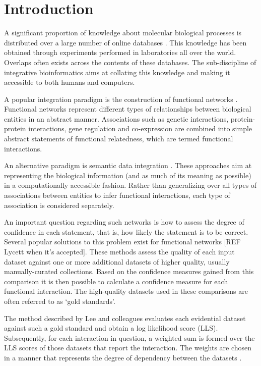 \documentclass{bioinfo}
\newcommand{\note}[1]{{\color{red}[#1]}}
\begin{document}
\section{Introduction} 

A significant proportion of knowledge about molecular biological processes is distributed over a large number of online databases \citep{stein_creating_2002}. This knowledge has been obtained through experiments performed in laboratories all over the world. Overlaps often exists across the contents of these databases. The sub-discipline of integrative bioinformatics aims at collating this knowledge and making it accessible to both humans and computers. 

A popular integration paradigm is the construction of functional networks \citep{lee_probabilistic_2004,von_mering_string:_2003,james_integration_2009}. Functional networks represent different types of relationships between biological entities in an abstract manner. Associations such as genetic interactions, protein-protein interactions, gene regulation and co-expression are combined into simple abstract statements of functional relatedness, which are termed functional interactions.

An alternative paradigm is semantic data integration \citep{cheung_yeasthub:_2005,smith_obo_2007,koehler_graph-based_2006,cerami_pathway_2010}. These approaches aim at representing the biological information (and as much of its meaning as possible) in a computationally accessible fashion. Rather than generalizing over all types of associations between entities to infer functional interactions, each type of association is considered separately.

An important question regarding such networks is how to assess the degree of confidence in each statement, that is, how likely the statement is to be correct. Several popular solutions to this problem exist for functional networks \citep{lee_probabilistic_2004}\note{REF Lycett when it's accepted}.
These methods assess the quality of each input dataset against one or more additional datasets of higher quality, usually manually-curated collections. Based on the confidence measures gained from this comparison it is then possible to calculate a confidence measure for each functional interaction. The high-quality datasets used in these comparisons are often referred to as `gold standards'. 

The method described by Lee and colleagues evaluates each evidential dataset against such a gold standard and obtain a log likelihood score (LLS). Subsequently, for each interaction in question, a weighted sum is formed over the LLS scores of those datasets that report the interaction. The weights are chosen in a manner that represents the degree of dependency between the datasets \citep{lee_probabilistic_2004}.
\end{document}
